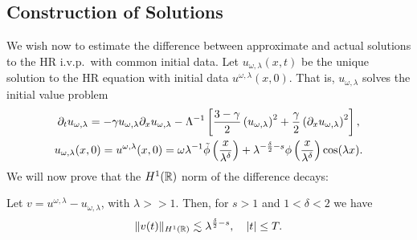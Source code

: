 \subsection{Construction of Solutions}
We wish now to estimate the difference between approximate and actual 
solutions to
the HR i.v.p.\ with common initial data. Let
$u_{\omega,\lambda}(x,t)$ be the unique solution to the HR equation
with initial data $u^{\omega,\lambda}(x,0)$. That is,
$u_{\omega,\lambda}$ solves the initial value problem
\begin{gather}
\partial_t u_{\omega,\lambda} = - \gamma u_{\omega,\lambda} \partial_x 
u_{\omega,\lambda} - \Lambda^{-1} \left[
\frac{3- \gamma}{2}\left( u_{\omega,\lambda} \right)^2 + 
\frac{\gamma}{2}\left(
\partial_x u_{\omega,\lambda} \right)^2
\right], \label{apple50}
\\
u_{\omega,\lambda}(x, 0) = u^{\omega,\lambda}(x,0) = \omega \lambda^{-1}
\tilde{\phi} \left( \frac{x}{\lambda^\delta} \right)
+ \lambda^{-\frac{\delta}{2} -s}
\phi\left( \frac{x}{\lambda^\delta} \right) \cos(\lambda x).
\label{apple41}
\end{gather}
%
%
%
We will now prove that the $H^1(\mathbb{R})$ norm of the difference decays: 
%
%
%
%
%
%
%
%
%
%
%
%
%
%
%
\begin{proposition}
\label{applelem:bound_for_difference-of-approx-and-actual-soln}
%
Let $v = u^{\omega,\lambda} - u_{\omega,\lambda}$, with $\lambda >>1$.
Then, for $s > 1$ and $1<\delta<2$ we have
%
%
\begin{equation} \|
v(t)
\|_{H^1(\mathbb{R})}
\lesssim \lambda^{\frac{\delta}{2} -s}, \quad
|t| \le T.
\end{equation}
%
%
\end{proposition}
%
%
